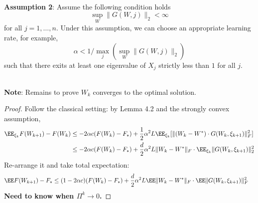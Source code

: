 ~\\

\noindent
\textbf{Assumption 2}: Assume the following condition holds
$$\sup_W \| G(W, j) \|_2 < \infty $$
for all $j = 1, \dots, n$. Under this assumption, we can choose an appropriate learning rate, for example, 
$$\alpha < 1/ \max_j( \sup_W \| G(W, j) \|_2)$$
such that there exits at least one eigenvalue of $X_j$ strictly less than $1$ for all $j$.  

~\\

\noindent
\textbf{Note}: Remains to prove $W_k$ converges to the optimal solution.

\begin{proof}
	Follow the classical setting: by Lemma 4.2 and the strongly convex assumption, 
	\begin{align*}
		\EE_{\xi_k} F(W_{k+1}) - F(W_k) &\leq  -2\alpha c ( F(W_k) - F_\ast ) + \frac{1}{2}\alpha^2 L \EE_{\xi_k}[ \|  (W_k - W^\ast) \cdot G(W_k, \xi_{k+1}) \|^2_{F} ] \\
		&\leq  -2\alpha c ( F(W_k) - F_\ast ) + \frac{d}{2}\alpha^2 L   \|  W_k - W^\ast \|_F  \cdot  \EE_{\xi_k}  \| G(W_k, \xi_{k+1}) \|^2_{2}   
	\end{align*} 
 	Re-arrange it and take total expectation:
 	\begin{align*}
 	\EE  F(W_{k+1}) - F_\ast &\leq  (1-2\alpha c) ( F(W_k) - F_\ast ) + \frac{d}{2}\alpha^2 L \EE  \|  W_k - W^\ast\|_F \cdot \EE \| G(W_k, \xi_{k+1}) \|^2_{F}  
 	\end{align*} 
 	\textbf{Need to know when $\Pi^k \to 0$.}
\end{proof} 
 
\newpage

